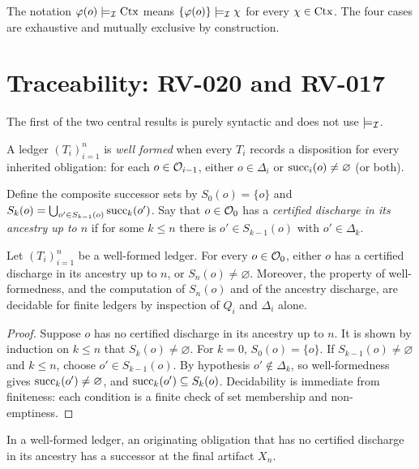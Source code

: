 The notation $\varphi(o) \models_{\mathcal{I}} \operatorname{Ctx}$ means $\{\varphi(o)\} \models_{\mathcal{I}} \chi$ for every $\chi \in \operatorname{Ctx}$. The four cases are exhaustive and mutually exclusive by construction.

\section{Traceability: RV-020 and RV-017}

The first of the two central results is purely syntactic and does not use $\models_{\mathcal{I}}$.

\begin{definition}
A ledger $(T_i)_{i=1}^n$ is \emph{well formed} when every $T_i$ records a disposition for every inherited obligation: for each $o \in \mathcal{O}_{i-1}$, either $o \in \Delta_i$ or $\operatorname{succ}_i(o) \neq \varnothing$ (or both).
\end{definition}

Define the composite successor sets by $S_0(o) = \{o\}$ and $S_{k}(o) = \bigcup_{o' \in S_{k-1}(o)} \operatorname{succ}_k(o')$. Say that $o \in \mathcal{O}_0$ has a \emph{certified discharge in its ancestry up to $n$} if for some $k \le n$ there is $o' \in S_{k-1}(o)$ with $o' \in \Delta_k$.

\begin{theorem}
\label{thm:trace}
Let $(T_i)_{i=1}^n$ be a well-formed ledger. For every $o \in \mathcal{O}_0$, either $o$ has a certified discharge in its ancestry up to $n$, or $S_n(o) \neq \varnothing$. Moreover, the property of well-formedness, and the computation of $S_n(o)$ and of the ancestry discharge, are decidable for finite ledgers by inspection of $Q_i$ and $\Delta_i$ alone.
\end{theorem}

\begin{proof}
Suppose $o$ has no certified discharge in its ancestry up to $n$. It is shown by induction on $k \le n$ that $S_k(o) \neq \varnothing$. For $k=0$, $S_0(o) = \{o\}$. If $S_{k-1}(o) \neq \varnothing$ and $k \le n$, choose $o' \in S_{k-1}(o)$. By hypothesis $o' \notin \Delta_k$, so well-formedness gives $\operatorname{succ}_k(o') \neq \varnothing$, and $\operatorname{succ}_k(o') \subseteq S_k(o)$. Decidability is immediate from finiteness: each condition is a finite check of set membership and non-emptiness.
\end{proof}

\begin{corollary}
\label{cor:nosilent}
In a well-formed ledger, an originating obligation that has no certified discharge in its ancestry has a successor at the final artifact $X_n$.
\end{corollary}

